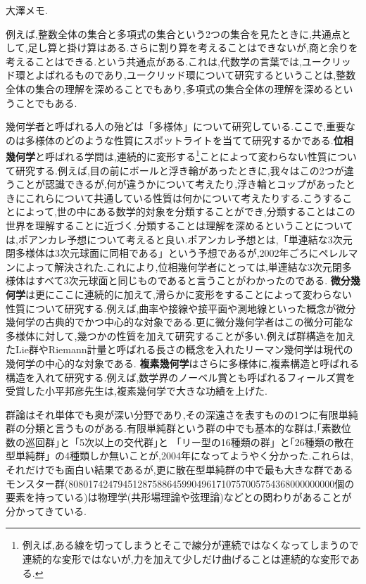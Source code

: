 大澤メモ.

例えば,整数全体の集合と多項式の集合という2つの集合を見たときに,共通点として,足し算と掛け算はある.さらに割り算を考えることはできないが,商と余りを考えることはできる.という共通点がある.これは,代数学の言葉では,ユークリッド環とよばれるものであり,ユークリッド環について研究するということは,整数全体の集合の理解を深めることでもあり,多項式の集合全体の理解を深めるということでもある.

幾何学者と呼ばれる人の殆どは「多様体」について研究している.ここで,重要なのは多様体のどのような性質にスポットライトを当てて研究するかである.{\bf 位相幾何学}と呼ばれる学問は,連続的に変形する\footnote{例えば,ある線を切ってしまうとそこで線分が連続ではなくなってしまうので連続的な変形ではないが,力を加えて少しだけ曲げることは連続的な変形である.}ことによって変わらない性質について研究する.例えば,目の前にボールと浮き輪があったときに,我々はこの2つが違うことが認識できるが,何が違うかについて考えたり,浮き輪とコップがあったときにこれらについて共通している性質は何かについて考えたりする.こうすることによって,世の中にある数学的対象を分類することができ,分類することはこの世界を理解することに近づく.分類することは理解を深めるということについては,ポアンカレ予想について考えると良い.ポアンカレ予想とは,「単連結な3次元閉多様体は3次元球面に同相である」という予想であるが,2002年ごろにペレルマンによって解決された.これにより,位相幾何学者にとっては,単連結な3次元閉多様体はすべて3次元球面と同じものであると言うことがわかったのである.
{\bf 微分幾何学}は更にここに連続的に加えて,滑らかに変形をすることによって変わらない性質について研究する.例えば,曲率や接線や接平面や測地線といった概念が微分幾何学の古典的でかつ中心的な対象である.更に微分幾何学者はこの微分可能な多様体に対して,幾つかの性質を加えて研究することが多い.例えば群構造を加えたLie群やRiemann計量と呼ばれる長さの概念を入れたリーマン幾何学は現代の幾何学の中心的な対象である.
{\bf 複素幾何学}はさらに多様体に,複素構造と呼ばれる構造を入れて研究する.例えば,数学界のノーベル賞とも呼ばれるフィールズ賞を受賞した小平邦彦先生は,複素幾何学で大きな功績を上げた.


群論はそれ単体でも奥が深い分野であり,その深遠さを表すものの1つに有限単純群の分類と言うものがある.有限単純群という群の中でも基本的な群は,｢素数位数の巡回群｣と「5次以上の交代群｣と
「リー型の16種類の群」と｢26種類の散在型単純群」の4種類しか無いことが,2004年になってようやく分かった.これらは,それだけでも面白い結果であるが,更に散在型単純群の中で最も大きな群であるモンスター群(808017424794512875886459904961710757005754368000000000個の要素を持っている)は物理学(共形場理論や弦理論)などとの関わりがあることが分かってきている.


